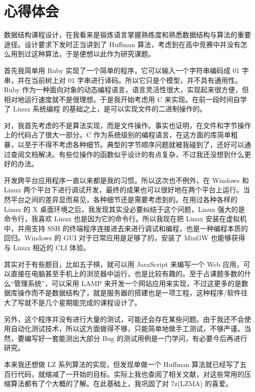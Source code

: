 \newpage
\section*{心得体会}

数据结构课程设计，在我看来是锻炼语言掌握熟练度和熟悉数据结构与算法的重要途径。设计要求下发时正当讲到了 Huffman 算法，考虑到在高中竞赛中并没有怎么用到过这种算法，于是便想以此作为研究课题。

首先我简单用 Ruby 实现了一个简单的程序，它可以输入一个字符串编码成 01 字串，并在当前树上对 01 字串进行译码。所以它只是个模型，并不具有通用性。Ruby 作为一种面向对象的动态编程语言，语言灵活性很大，实现起来很方便，但相对地运行速度就不是很理想。于是我开始考虑用 C 来实现。在前一段时间自学了 Linux 系统编程 \cite{linuxmnl} 的基础之上，是可以实现文件的二进制操作的。

对，我首先考虑的不是算法实现，而是文件操作。事实也证明，在文件和字节操作上的代码占了很大一部分。C 作为系统级别的编程语言，在这方面的库简单粗暴，以至于不得不考虑各种细节。典型的字节顺序问题就被我碰到了，还好可以通过查阅文档解决。有些位操作的函数似乎设计的有点复杂，不过我还没想到什么更好的办法。

开发跨平台应用程序一直以来都是我的习惯。所以这次也不例外，在 Windows 和 Linux 两个平台下进行调试开发，最终的成果也可以很好地在两个平台上运行。当然平台之间的差异显而易见，各种细节还是需要考虑到的。在用过各种各样的 Linux 的 X 桌面环境之后，我发现其实没必要纠结于这个问题，Linux 强大的是命令行，我喜欢 Linux 也是因为它的命令行。所以我现在把 Linux 安装在虚拟机中，并用支持 SSH 的终端程序连接进去来进行调试和编程，也是一种编程本质的回归。Windows 的 GUI 对于日常应用是足够了的，安装了 MinGW 也能够获得与 Linux 相近的 CLI 体验。

其实对于有些题目，比如五子棋，就可以用 JavaScript 来编写一个 Web 应用，可以直接在电脑甚至手机上的浏览器中运行，也是比较有趣的。至于占课题多数的什么“管理系统”，可以采用 LAMP 来开发一个网站应用来实现，不过这更多的是数据库操作而不是数据结构了，就是服务器的搭建也是一项工程，这种程序/软件往大了写就不是几个星期能完成的课程设计了。

另外，这个程序并没有进行大量的测试，可能还会存在某些问题。由于我还不会使用自动化测试技术，所以这方面做得不够，只能简单地做手工测试，不够严谨。当然，要编写好一套能测出大部分 Bug 的测试用例是一门学问，有必要今后再进行研究。

本来我还想做 LZ 系列算法的实现，但发现单做一个 Huffman 算法就已经写了五百行代码，就缩减了一开始的目标。实际上我也查阅了相关文献，对这些常用的压缩算法都有了个大概的了解。在此基础上，我巩固了对 7z(LZMA) 的喜爱。

